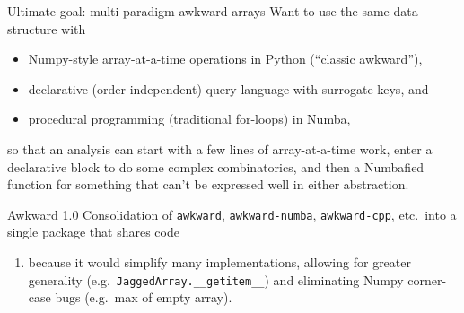\documentclass[aspectratio=169]{beamer}
\begin{document}
\begin{frame}{Ultimate goal: multi-paradigm awkward-arrays}
\large
\vspace{0.5 cm}
{\Large Want to use the same data structure with}

\vspace{0.15 cm}
\begin{itemize}
\item Numpy-style array-at-a-time operations in Python (``classic awkward''),
\item declarative (order-independent) query language with surrogate keys, and
\item procedural programming (traditional for-loops) in Numba,
\end{itemize}

\vspace{0.15 cm}
so that an analysis can start with a few lines of array-at-a-time work, enter a declarative block to do some complex combinatorics, and then a Numbafied function for something that can't be expressed well in either abstraction.
\end{frame}

\begin{frame}{Awkward 1.0}
\large
\vspace{0.5 cm}
{\Large Consolidation of {\tt awkward}, {\tt awkward-numba}, {\tt awkward-cpp}, etc.\ into a single package that shares code}

\begin{enumerate}
\item because it would simplify many implementations, allowing for greater generality (e.g.\ {\normalsize \texttt{JaggedArray.__getitem__}}) and eliminating Numpy corner-case bugs (e.g.\ max of empty array).

\end{enumerate}

\end{frame}

\begin{frame}{}
\end{frame}
\end{document}
